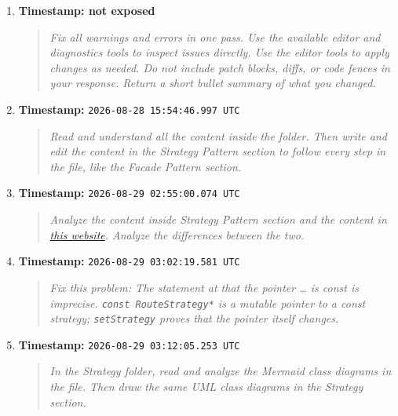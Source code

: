 \documentclass[11pt,a4paper]{report}
\begin{document}
\begin{enumerate}
  \item \textbf{Timestamp: not exposed}
  \begin{quote}\itshape
  Fix all warnings and errors in one pass. Use the available editor and
  diagnostics tools to inspect issues directly. Use the editor tools to apply
  changes as needed. Do not include patch blocks, diffs, or code fences in your
  response. Return a short bullet summary of what you changed.
  \end{quote}

  \item \textbf{Timestamp:} \verb|2026-08-28 15:54:46.997 UTC|
  \begin{quote}\itshape
  Read and understand all the content inside the  folder.
  Then write and edit the content in the \textquotedbl{}Strategy
  Pattern\textquotedbl{} section to follow every step in the
   file, like the \textquotedbl{}Facade
  Pattern\textquotedbl{} section.
  \end{quote}

  \item \textbf{Timestamp:} \verb|2026-08-29 02:55:00.074 UTC|
  \begin{quote}\itshape
  Analyze the content inside \textquotedbl{}Strategy Pattern\textquotedbl{}
  section and the content in
  \href{https://refactoring.guru/design-patterns/strategy}{this website}.
  Analyze the differences between the two.
  \end{quote}

  \item \textbf{Timestamp:} \verb|2026-08-29 03:02:19.581 UTC|
  \begin{quote}\itshape
  Fix this problem: \textquotedbl{}The statement at  that
  \textquotedbl{}the pointer \ldots{} is const\textquotedbl{} is imprecise.
  \texttt{const RouteStrategy*} is a mutable pointer to a const strategy;
  \texttt{setStrategy} proves that the pointer itself changes.\textquotedbl{}
  \end{quote}

  \item \textbf{Timestamp:} \verb|2026-08-29 03:12:05.253 UTC|
  \begin{quote}\itshape
  In the \textquotedbl{}Strategy\textquotedbl{} folder, read and analyze the
  Mermaid class diagrams in the  file. Then draw the same UML
  class diagrams in the Strategy section.
  \end{quote}


\end{enumerate}
\end{document}
